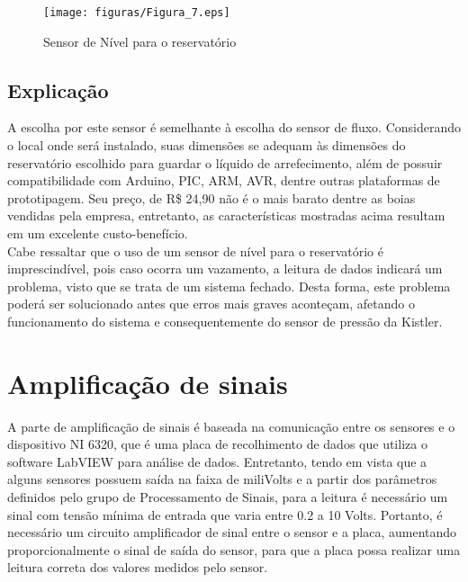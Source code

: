 \begin{figure}[!htb]                   
	\centering                          
	\texttt{[image: figuras/Figura\_7.eps]}
	\caption{Sensor de Nível para o reservatório}               
\end{figure}
\subsection{Explicação}
A escolha por este sensor é semelhante à escolha do sensor de fluxo. Considerando o local onde será instalado, suas dimensões se adequam às dimensões do reservatório escolhido para guardar o líquido de arrefecimento, além de possuir compatibilidade com Arduino, PIC, ARM, AVR, dentre outras plataformas de prototipagem. Seu preço, de R\$ 24,90 não é o mais barato dentre as boias vendidas pela empresa, entretanto, as características mostradas acima resultam em um excelente custo-benefício.\\
Cabe ressaltar que o uso de um sensor de nível para o reservatório é imprescindível, pois caso ocorra um vazamento, a leitura de dados indicará um problema, visto que se trata de um sistema fechado. Desta forma, este problema poderá ser solucionado antes que erros mais graves aconteçam, afetando o funcionamento do sistema e consequentemente do sensor de pressão da Kistler.\\
\section{Amplificação de sinais}
A parte de amplificação de sinais é baseada na comunicação entre os sensores e o dispositivo NI 6320, que é uma placa de recolhimento de dados que utiliza o software LabVIEW para análise de dados. Entretanto, tendo em vista que a alguns sensores possuem saída na faixa de miliVolts e a partir dos parâmetros definidos pelo grupo de Processamento de Sinais, para a leitura é necessário um sinal com tensão mínima de entrada que varia entre 0.2 a 10 Volts. Portanto, é necessário um circuito amplificador de sinal entre o sensor e a placa, aumentando proporcionalmente o sinal de saída do sensor, para que a placa possa realizar uma leitura correta dos valores medidos pelo sensor.
